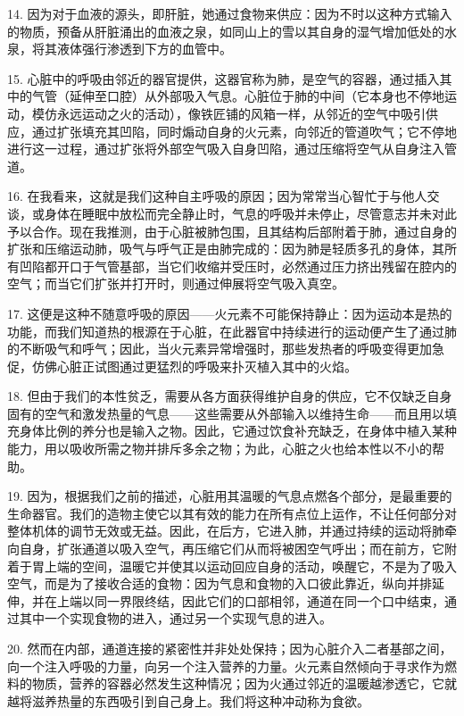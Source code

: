 14. 因为对于血液的源头，即肝脏，她通过食物来供应：因为不时以这种方式输入的物质，预备从肝脏涌出的血液之泉，如同山上的雪以其自身的湿气增加低处的水泉，将其液体强行渗透到下方的血管中。\par

15. 心脏中的呼吸由邻近的器官提供，这器官称为肺，是空气的容器，通过插入其中的气管（延伸至口腔）从外部吸入气息。心脏位于肺的中间（它本身也不停地运动，模仿永远运动之火的活动），像铁匠铺的风箱一样，从邻近的空气中吸引供应，通过扩张填充其凹陷，同时煽动自身的火元素，向邻近的管道吹气；它不停地进行这一过程，通过扩张将外部空气吸入自身凹陷，通过压缩将空气从自身注入管道。\par

16. 在我看来，这就是我们这种自主呼吸的原因；因为常常当心智忙于与他人交谈，或身体在睡眠中放松而完全静止时，气息的呼吸并未停止，尽管意志并未对此予以合作。现在我推测，由于心脏被肺包围，且其结构后部附着于肺，通过自身的扩张和压缩运动肺，吸气与呼气正是由肺完成的：因为肺是轻质多孔的身体，其所有凹陷都开口于气管基部，当它们收缩并受压时，必然通过压力挤出残留在腔内的空气；而当它们扩张并打开时，则通过伸展将空气吸入真空。\par

17. 这便是这种不随意呼吸的原因——火元素不可能保持静止：因为运动本是热的功能，而我们知道热的根源在于心脏，在此器官中持续进行的运动便产生了通过肺的不断吸气和呼气；因此，当火元素异常增强时，那些发热者的呼吸变得更加急促，仿佛心脏正试图通过更猛烈的呼吸来扑灭植入其中的火焰。\par

18. 但由于我们的本性贫乏，需要从各方面获得维护自身的供应，它不仅缺乏自身固有的空气和激发热量的气息——这些需要从外部输入以维持生命——而且用以填充身体比例的养分也是输入之物。因此，它通过饮食补充缺乏，在身体中植入某种能力，用以吸收所需之物并排斥多余之物；为此，心脏之火也给本性以不小的帮助。\par

19. 因为，根据我们之前的描述，心脏用其温暖的气息点燃各个部分，是最重要的生命器官。我们的造物主使它以其有效的能力在所有点位上运作，不让任何部分对整体机体的调节无效或无益。因此，在后方，它进入肺，并通过持续的运动将肺牵向自身，扩张通道以吸入空气，再压缩它们从而将被困空气呼出；而在前方，它附着于胃上端的空间，温暖它并使其以运动回应自身的活动，唤醒它，不是为了吸入空气，而是为了接收合适的食物：因为气息和食物的入口彼此靠近，纵向并排延伸，并在上端以同一界限终结，因此它们的口部相邻，通道在同一个口中结束，通过其中一个实现食物的进入，通过另一个实现气息的进入。\par

20. 然而在内部，通道连接的紧密性并非处处保持；因为心脏介入二者基部之间，向一个注入呼吸的力量，向另一个注入营养的力量。火元素自然倾向于寻求作为燃料的物质，营养的容器必然发生这种情况；因为火通过邻近的温暖越渗透它，它就越将滋养热量的东西吸引到自己身上。我们将这种冲动称为食欲。\par


